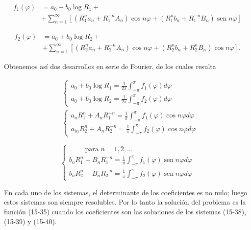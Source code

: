 \documentclass[10pt]{article}
\theoremstyle{plain}
\theoremstyle{definition}
\theoremstyle{remark}
\begin{document}
$$
\begin{aligned}
f_{1}(\varphi) & =a_{0}+b_{0} \log R_{1}+ \\
& +\sum_{n=1}^{\infty}\left[\left(R_{1}^{n} a_{n}+R_{1}^{-n} A_{n}\right) \cos n \varphi+\left(R_{1}^{n} b_{n}+R_{1}^{-n} B_{n}\right) \operatorname{sen} n \varphi\right]
\end{aligned}
$$

$$
\begin{aligned}
f_{2}(\varphi) & =a_{0}+b_{0} \log R_{2}+ \\
& +\sum_{n=1}^{\infty}\left[\left(R_{2}^{n} a_{n}+R_{2}^{-n} A_{n}\right) \cos n \varphi+\left(R_{2}^{n} b_{n}+R_{2}^{n} B_{n}\right) \cos n \varphi\right] .
\end{aligned}
$$

Obtenemos así dos desarrollos en serie de Fourier, de los cuales resulta


\begin{align*}
& \left\{\begin{array}{l}
a_{0}+b_{0} \log R_{1}=\frac{1}{2 \pi} \int_{-\pi}^{\pi} f_{1}(\varphi) d \varphi \\
a_{0}+b_{0} \log R_{2}=\frac{1}{2 \pi} \int_{-\pi}^{\pi} f_{2}(\varphi) d \varphi
\end{array}\right.  \tag{15-38}\\
& \left\{\begin{array}{l}
a_{n} R_{1}^{n}+A_{n} R_{1}^{-n}=\frac{1}{\pi} \int_{-\pi}^{\pi} f_{1}(\varphi) \cos n \varphi d \varphi \\
a_{i n} R_{2}^{n}+A_{n} R_{2}^{-n}=\frac{1}{\pi} \int_{-\pi}^{\pi} f_{2}(\varphi) \cos n \varphi d \varphi
\end{array}\right. \tag{15-39}
\end{align*}



\[
\left\{\begin{array}{l}
\quad \quad \text { para } n=1,2, \ldots \\
b_{n} R_{1}^{n}+B_{n} R_{1}^{-n}=\frac{1}{\pi} \int_{-\pi}^{\pi} f_{1}(\varphi) \operatorname{sen} n \varphi d \varphi  \tag{15-40}\\
b_{n} R_{2}^{n}+B_{n} R_{2}^{-n}=\frac{1}{\pi} \int_{-\pi}^{\pi} f_{2}(\varphi) \operatorname{sen} n \varphi d \varphi
\end{array}\right.
\]

En cada uno de los sistemas, el determinante de los coeficientes es no nulo; luego estos sistemas son siempre resolubles. Por lo tanto la solución del problema es la función (15-35) cuando los coeficientes son las soluciones de los sistemas (15-38), (15-39) y (15-40).
\end{document}
